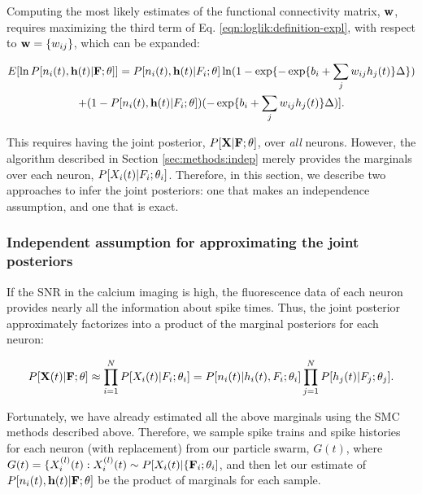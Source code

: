 Computing the most likely estimates of the functional connectivity matrix, $\mathbf{w}$, requires maximizing the third term of Eq. \eqref{eqn:loglik:definition-expl}, with respect to $\mathbf{w}=\{w_{ij}\}$, which can be expanded:

\begin{multline} \label{eqn:bws}
	E [\ln P[n_i(t), \mathbf{h}(t) | {\bf F}; \mathbf{\theta}]] = P[n_i(t), \mathbf{h}(t) | F_i; \mathbf{\theta}] \ln (1-\exp\{-\exp\{b_i + \sum_j w_{ij} h_j(t)\}\Delta\})
	\\ +  (1-P[n_i(t), \mathbf{h}(t) | F_i; \mathbf{\theta}]) (-\exp\{b_i + \sum_j w_{ij} h_j(t)\}\Delta)].
\end{multline}

\noindent This requires having the joint posterior, $P[{\bf X} | {\bf F}; \mathbf{\theta}]$, over \emph{all} neurons.  However, the algorithm described in Section \ref{sec:methods:indep} merely provides the marginals over each neuron, $P[X_i(t) | F_i; \mathbf{\theta}_i]$.  Therefore, in this section, we describe two approaches to infer the joint posteriors: one that makes an independence assumption, and one that is exact.

\subsubsection{Independent assumption for approximating the joint posteriors}

If the SNR in the calcium imaging is high,  the fluorescence data of each neuron provides nearly all the information about spike times.  Thus, the joint posterior approximately factorizes into a product of the marginal posteriors for each neuron:

\begin{equation} \label{eqn:indep_approx}
	P[{\bf X}(t)|{\bf F};\theta]  \approx \prod_{i=1}^N P[X_i(t)|F_i; \mathbf{\theta}_i] = P[n_i(t)| h_i(t), F_i; \mathbf{\theta}_i] \prod_{j=1}^N P[h_j(t)|F_j; \mathbf{\theta}_j]. 
\end{equation}
	
\noindent Fortunately, we have already estimated all the above marginals using the SMC methods described above.  
Therefore, we sample spike trains and spike histories for each neuron (with replacement) from our particle swarm, $G(t)$, where $G(t)=\{X_i^{(l)}(t):  X_i^{(l)}(t) \sim P[X_i(t)|\{{\bf F}_i;\theta_i]$,  and then let our estimate of $P[n_i(t), \mathbf{h}(t) | {\bf F}; \mathbf{\theta}]$ be the product of marginals for each sample.

